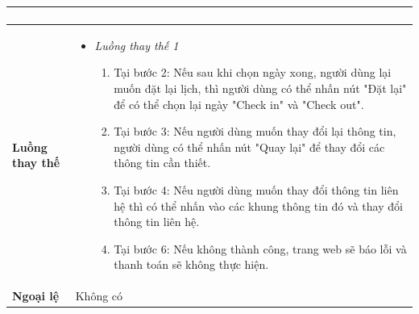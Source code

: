 \begin{enumerate}[label=\textbf{(\alph*)}]
\begin{center}
\begin{longtable}{ | l |p{10cm}|}
\begin{enumerate}
			\end{enumerate} \\ \hline 
			\textbf{Luồng thay thế} & 
			\begin{itemize} 
				\item \textit{Luồng thay thế 1}
				\begin{enumerate}
					\item Tại bước 2:  Nếu sau khi chọn ngày xong, người dùng lại muốn đặt lại lịch, thì người dùng có thể nhấn nút "Đặt lại" để có thể chọn lại ngày "Check in" và "Check out".
					\item Tại bước 3: Nếu người dùng muốn thay đổi lại thông tin, người dùng có thể nhấn nút "Quay lại" để thay đổi các thông tin cần thiết.
					\item Tại bước 4: Nếu người dùng muốn thay đổi thông tin liên hệ thì có thể nhấn vào các khung thông tin đó và thay đổi thông tin liên hệ.
					\item Tại bước 6: Nếu không thành công, trang web sẽ báo lỗi và thanh toán sẽ không thực hiện.
				\end{enumerate}
			\end{itemize} \\ \hline 
			\textbf{Ngoại lệ}  & Không có \\
			\hline
		\end{longtable}
	\end{center}
\end{enumerate}
